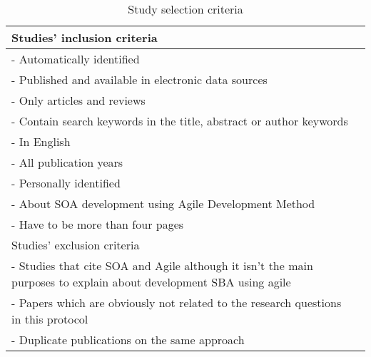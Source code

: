 \begin{table}[ht]
\begin{tabularx}{.9\textwidth}{Xl}
\hline
Studies' inclusion criteria  \\ \hline
- Automatically identified \\
\hspace{1cm}  - Published and available in electronic data sources \\
\hspace{1cm}  - Only articles and reviews \\
\hspace{1cm}  - Contain search keywords in the title, abstract or author keywords \\
\hspace{1cm}  - In English \\
\hspace{1cm}  - All publication years \\
- Personally identified \\
\hspace{1cm}  - About SOA development using Agile Development Method \\
\hspace{1cm}  - Have to be more than four pages \\
\hline
Studies' exclusion criteria \\ \hline
- Studies that cite SOA and Agile although it isn't the main purposes to explain about development SBA using agile \\
- Papers which are obviously not related to the research questions in this protocol \\
- Duplicate publications on the same approach  \\ \hline
\end{tabularx}
\caption{Study selection criteria}
\label{tab:StudySelectionCriteria}
\end{table}

